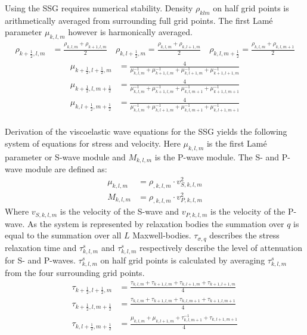 \documentclass[pdftex,a4paper,parskip,listof=totoc,bibliography=totoc,onehalfspacing,12pt]{scrreprt}
\begin{document}
Using the SSG  requires numerical stability. Density $\rho_{klm}$ on half grid points is arithmetically averaged from surrounding full grid points. The first Lam\'{e} parameter $\mu_{k,l,m}$ however is harmonically averaged. 
\begin{align*}
	\rho_{k+\frac{1}{2},l,m} &= \frac{\rho_{k,l,m} + \rho_{k+1,l,m}}{2} \quad \rho_{k,l+\frac{1}{2},m} = \frac{\rho_{k,l,m} + \rho_{k,l+1,m}}{2} \quad \rho_{k,l,m+\frac{1}{2}} = \frac{\rho_{k,l,m} + \rho_{k,l,m+1}}{2}
\end{align*}
\begin{align*}
	\mu_{k+\frac{1}{2},l+\frac{1}{2},m} &= \frac{4}{\mu^{-1}_{k,l,m} + \mu^{-1}_{k+1,l,m} + \mu^{-1}_{k,l+1,m} + \mu^{-1}_{k+1,l+1,m}}\\
	\mu_{k+\frac{1}{2},l,m+\frac{1}{2}} &= \frac{4}{\mu^{-1}_{k,l,m} + \mu^{-1}_{k+1,l,m} + \mu^{-1}_{k,l,m+1} + \mu^{-1}_{k+1,l,m+1}}\\
	\mu_{k,l+\frac{1}{2},m+\frac{1}{2}} &= \frac{4}{\mu^{-1}_{k,l,m} + \mu^{-1}_{k,l+1,m} + \mu^{-1}_{k,l,m+1} + \mu^{-1}_{k,l+1,m+1}}
\end{align*}
\\
Derivation of the viscoelastic wave equations for the SSG yields the following system of equations for stress and velocity. Here $\mu_{k,l,m}$ is the first Lam\'{e} parameter or S-wave module and $M_{k,l,m}$ is the P-wave module.
The S- and P-wave module are defined as:
\begin{align}
	\mu_{k,l,m}&= \rho_{,k,l,m}\cdot v_{S,k,l,m}^{2}\\
	M_{k,l,m} &= \rho_{,k,l,m}\cdot v_{P,k,l,m}^{2}
\end{align}
 Where $v_{S,k,l,m}$ is the velocity of the S-wave and $v_{P,k,l,m}$ is the velocity of the P-wave.
As the system is represented by relaxation bodies the summation over $q$ is equal to the summation over all $L$ Maxwell-bodies. $\tau_{\sigma,q}$ describes the stress relaxation time and $\tau_{k,l,m}^s$ and $\tau_{k,l,m}^s$ respectively describe the level of attenuation for S- and P-waves. $\tau_{k,l,m}^s$ on half grid points is calculated by averaging $\tau_{k,l,m}^s$  from the four surrounding grid points. 
\begin{align*}
	\tau_{k+\frac{1}{2},l+\frac{1}{2},m} &= \frac{\tau_{k,l,m} + \tau_{k+1,l,m} + \tau_{k,l+1,m} + \tau_{k+1,l+1,m}}{4}\\
	\tau_{k+\frac{1}{2},l,m+\frac{1}{2}} &= \frac{\tau_{k,l,m} + \tau_{k+1,l,m} + \tau_{k,l,m+1} + \tau_{k+1,l,m+1}}{4}\\
	\tau_{k,l+\frac{1}{2},m+\frac{1}{2}} &= \frac{\mu_{k,l,m} + \mu_{k,l+1,m} + \tau^{-1}_{k,l,m+1} + \tau_{k,l+1,m+1}}{4}
\end{align*}
\end{document}

